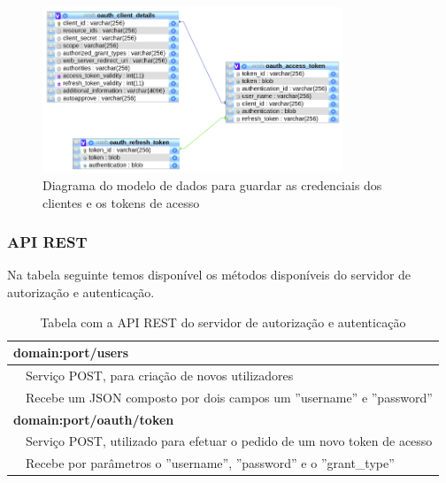  \begin{figure}[H]
  \centering
  \includegraphics[width=0.8\textwidth]{imgs/auth-diagram.png}
  \caption[Diagrama do modelo de dados para guardar as credenciais dos clientes e os tokens de acesso]{Diagrama do modelo de dados para guardar as credenciais dos clientes e os tokens de acesso}
  
  \label{f:auth-diagram}
\end{figure}

\subsubsection{API REST}
\label{l:restapiAUTH}
Na tabela seguinte temos disponível os métodos disponíveis do servidor de autorização e autenticação.
\begin{table}[H]
\label{t:apirest-auth}
\centering
\begin{tabularx}{1\textwidth}{|p{0.3cm} p{14.4cm}|}
\multicolumn{2}{l}{\textbf{domain:port/users}}  \\ \hline 
 & Serviço POST, para criação de novos utilizadores \\
 & Recebe um JSON composto por dois campos um ''username'' e ''password'' \\ \hline
\multicolumn{2}{l}{\textbf{domain:port/oauth/token}} \\ \hline
 & Serviço POST, utilizado para efetuar o pedido de um novo token de acesso \\
 & Recebe por parâmetros o ''username'', ''password'' e o ''grant\_type'' \\ \hline
\end{tabularx}
\caption{Tabela com a API REST do servidor de autorização e autenticação}
\end{table}

